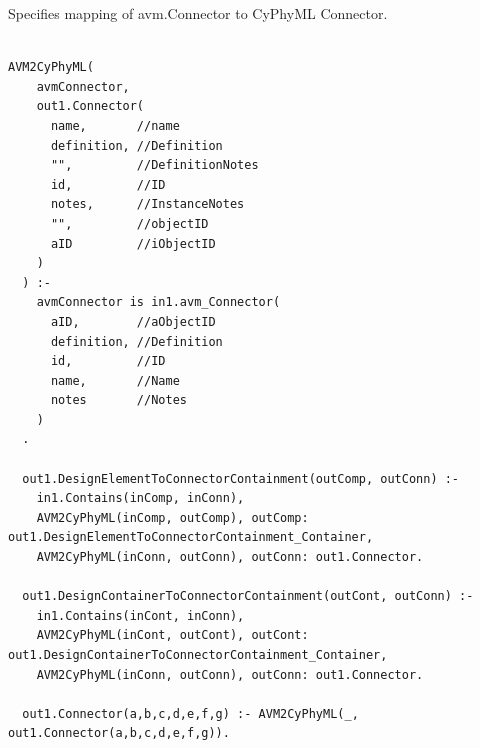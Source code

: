 Specifies mapping of avm.Connector to CyPhyML Connector.
\begin{lstlisting}

AVM2CyPhyML(
    avmConnector,
    out1.Connector(
      name,       //name
      definition, //Definition
      "",         //DefinitionNotes
      id,         //ID
      notes,      //InstanceNotes
      "",         //objectID
      aID         //iObjectID
    )
  ) :-
    avmConnector is in1.avm_Connector(
      aID,        //aObjectID
      definition, //Definition
      id,         //ID
      name,       //Name
      notes       //Notes
    )
  .

  out1.DesignElementToConnectorContainment(outComp, outConn) :-
    in1.Contains(inComp, inConn),
    AVM2CyPhyML(inComp, outComp), outComp: out1.DesignElementToConnectorContainment_Container,
    AVM2CyPhyML(inConn, outConn), outConn: out1.Connector.

  out1.DesignContainerToConnectorContainment(outCont, outConn) :-
    in1.Contains(inCont, inConn),
    AVM2CyPhyML(inCont, outCont), outCont: out1.DesignContainerToConnectorContainment_Container,
    AVM2CyPhyML(inConn, outConn), outConn: out1.Connector.

  out1.Connector(a,b,c,d,e,f,g) :- AVM2CyPhyML(_, out1.Connector(a,b,c,d,e,f,g)).


\end{lstlisting}

